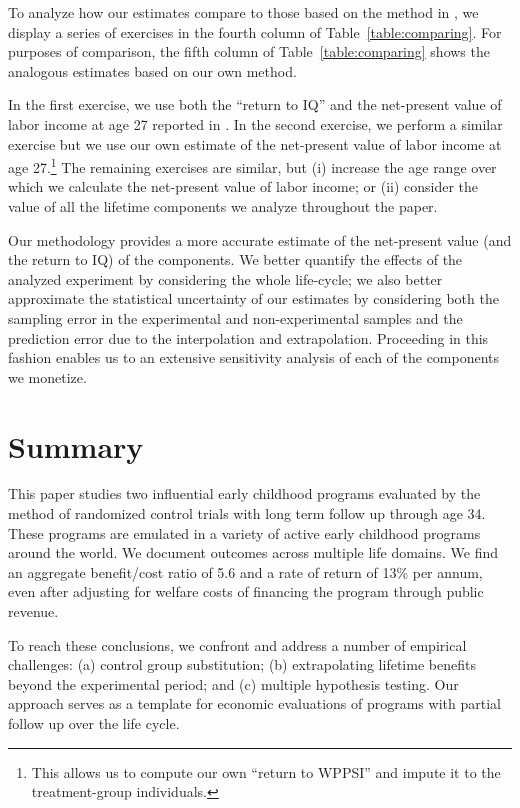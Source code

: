 To analyze how our estimates compare to those based on the method in \citet{Kline_Walters_2016_QJE}, we display a series of exercises in the fourth column of Table~\ref{table:comparing}. For purposes of comparison, the fifth column of Table~\ref{table:comparing} shows the analogous estimates based on our own method.

In the first exercise, we use both the ``return to IQ'' and the net-present value of labor income at age 27 reported in  \citet{Chetty_Friedman_etal_2011_QJoE}. In the second exercise, we perform a similar exercise but we use our own estimate of the net-present value of labor income at age 27.\footnote{This allows us to compute our own ``return to WPPSI'' and impute it to the treatment-group individuals.} The remaining exercises are similar, but (i) increase the age range over which we calculate the net-present value of labor income; or (ii) consider the value of all the lifetime components we analyze throughout the paper.

Our methodology provides a more accurate estimate of the net-present value (and the return to IQ) of the components. We better quantify the effects of the analyzed experiment by considering the whole life-cycle; we also better approximate the statistical uncertainty of our estimates by considering both the sampling error in the experimental and non-experimental samples and the prediction error due to the interpolation and extrapolation. Proceeding in this fashion enables us to an extensive sensitivity analysis of each of the components we monetize.

\section{Summary} \label{section:conclusion}

This paper studies two influential early childhood programs evaluated by the method of randomized control trials with long term follow up through age 34. These programs are emulated in a variety of active early childhood programs around the world. We document outcomes across multiple life domains. We find an aggregate benefit/cost ratio of 5.6 and a rate of return of 13\% per annum, even after adjusting for welfare costs of financing the program through public revenue.

To reach these conclusions, we confront and address a number of empirical challenges: (a) control group substitution; (b) extrapolating lifetime benefits beyond the experimental period; and (c) multiple hypothesis testing. Our approach serves as a template for economic evaluations of programs with partial follow up over the life cycle.

